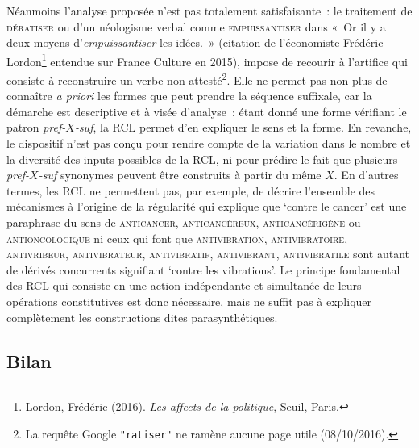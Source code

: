 \documentclass[output=paper]{langsci/langscibook}
\begin{document}
Néanmoins l'analyse proposée n'est pas totalement satisfaisante~: le traitement de \textsc{dératiser} ou d'un néologisme verbal comme \textsc{empuissantiser} dans «~Or il y a deux moyens d'\emph{empuissantiser} les idées.~» (citation de l'économiste Frédéric Lordon\footnote{%
  Lordon, Frédéric (2016). \emph{Les affects de la politique}, Seuil, Paris.%
} entendue sur France Culture en 2015), impose de recourir à l'artifice qui consiste à reconstruire un verbe non attesté\footnote{%
  La requête Google \texttt{"ratiser"} ne ramène aucune page utile (08/10/2016).%
}. Elle ne permet pas non plus de connaître \emph{a priori} les formes que peut prendre la séquence suffixale, car la démarche est descriptive et à visée d'analyse~: étant donné une forme vérifiant le patron \emph{\mbox{pref-$X$-suf}}, la RCL permet d'en expliquer le sens et la forme.  En revanche, le dispositif n'est pas conçu pour rendre compte de la variation dans le nombre et la diversité des inputs possibles de la RCL, ni pour prédire le fait que plusieurs \emph{\mbox{pref-$X$-suf}} synonymes peuvent être construits à partir du même $X$.  En d'autres termes, les RCL ne permettent pas, par exemple, de décrire l'ensemble des mécanismes à l'origine de la régularité qui explique que `contre le cancer' est une  paraphrase du sens de \textsc{anticancer}, \textsc{anticancéreux}, \textsc{anticancérigène} ou \textsc{antioncologique} ni ceux qui font que \textsc{antivibration}, \textsc{antivibratoire}, \textsc{antivribeur}, \textsc{antivibrateur}, \textsc{antivibratif}, \textsc{antivibrant}, \textsc{antivibratile} sont autant de dérivés concurrents signifiant `contre les vibrations'.  Le principe fondamental des RCL qui consiste en une action indépendante et simultanée de leurs opérations constitutives est donc nécessaire, mais ne suffit pas à expliquer complètement les constructions dites parasynthétiques.

\subsection{Bilan}
\label{sec:RCL-Bilan}
\end{document}
